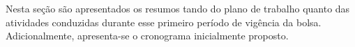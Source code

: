 Nesta seção são apresentados os resumos tando do plano de trabalho quanto das atividades conduzidas durante esse primeiro período de vigência da bolsa. Adicionalmente, apresenta-se o cronograma inicialmente proposto.
